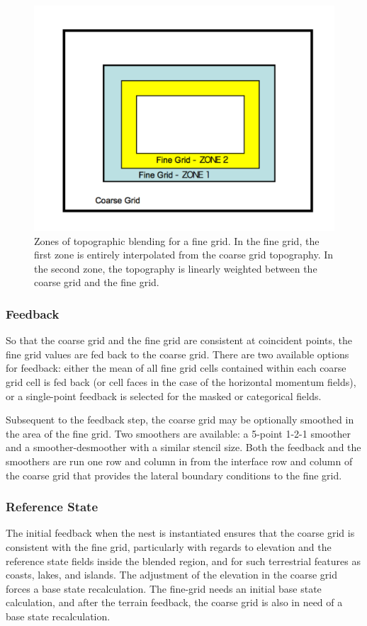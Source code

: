 %
%
\begin{figure} 
 \centering
  \includegraphics[width=4.5in]{figures/zone12.pdf}
  \caption{\label{figure:zone12} 
Zones of topographic blending
for a fine grid.  In the fine grid, the first zone is
entirely interpolated from the coarse grid topography.  In
the second zone, the topography is linearly weighted between
the coarse grid and the fine grid.}
\end{figure}

\subsubsection{Feedback}
So that the coarse grid and the fine grid are consistent at coincident points, the 
fine grid values are fed back to the coarse grid.
There are two available 
options for feedback: either the mean of all fine grid cells contained 
within each coarse grid cell is fed back (or cell faces in the case of the
horizontal momentum fields), or a single-point feedback 
is selected for the masked or categorical fields.

Subsequent to the feedback step, the coarse grid may be optionally smoothed in the area
of the fine grid.  Two smoothers are available: a 5-point 1-2-1 smoother and a smoother-desmoother
with a similar stencil size.
Both the feedback and the smoothers are run one row and column in from the 
interface row and column of the coarse grid that provides
the lateral boundary conditions to the fine grid.

\subsubsection{Reference State}
The initial feedback when the nest is instantiated ensures
that the coarse grid is consistent with the fine grid, particularly 
with regards to elevation and the reference state fields inside the blended region, and for such 
terrestrial features as coasts, lakes, and islands.  The adjustment 
of the elevation in the coarse grid forces a base state recalculation.  
The fine-grid needs an initial base state calculation, and after
the terrain feedback, the coarse grid is also in need of a base state
recalculation.

